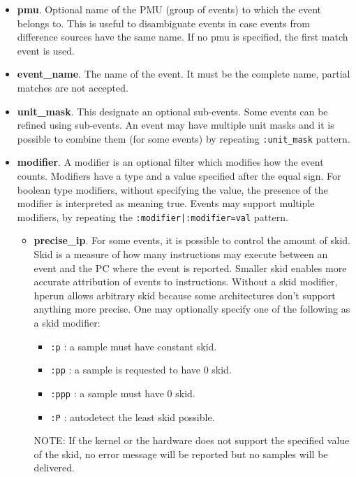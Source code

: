 \documentclass[english]{article}
\begin{document}
\begin{itemize}
	\item \textbf{pmu}.  Optional name of the PMU (group of events) to which the event belongs to. This is useful to disambiguate events in case events from difference sources have the same name. If no pmu is specified, the first match event is used.
	\item \textbf{event\_name}.  The name of the event. It must be the complete name, partial matches are not accepted. 
	\item \textbf{unit\_mask}.  This designate an optional sub-events. Some events can be refined using sub-events. An event may have multiple unit masks and it is possible to combine them (for some events) by repeating \texttt{:unit\_mask} pattern.
	\item \textbf{modifier}.  A modifier is an optional filter which modifies how the event counts. Modifiers have a type and a value specified after the equal sign. 
		For boolean type modifiers, without specifying the value, the presence of the modifier is interpreted as meaning true. Events may support multiple modifiers, by repeating the \texttt{:modifier|:modifier=val} pattern. 
	\begin{itemize}
                \item \textbf{precise\_ip}. For some events, it is possible to control the amount of skid.
Skid is a measure of how many instructions may execute between an event and the PC where the event is reported.
Smaller skid enables more accurate attribution of events to instructions. Without a skid modifier, hpcrun allows arbitrary skid because some architectures
don't support anything more precise.  One may optionally specify one of the following as a skid modifier:
                        \begin{itemize}
                                \item \verb+:p+ : a sample must have constant skid.
                                \item \verb+:pp+ : a sample is requested to have 0 skid.
                                \item \verb+:ppp+ : a sample must have 0 skid.
                                \item \verb+:P+ : autodetect the least skid possible.
                        \end{itemize}
                        NOTE: If the kernel or the hardware does not support the specified value of the skid, no error message will be reported
but no samples will be delivered.
        \end{itemize}
\end{itemize}
\end{document}
